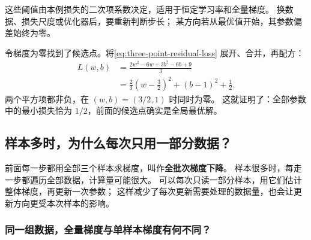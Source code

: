 \begin{boundarybox}
这些阈值由本例损失的二次项系数决定，适用于恒定学习率和全量梯度。
换数据、损失尺度或优化器后，要重新判断步长；
某方向若从最优值开始，其参数偏差始终为零。
\end{boundarybox}

\begin{example}[breakable=false,title={{\symboliconfont ★} 选读证明：为什么这是全局最小？}]
\label{proof:three-point-global-minimum}
令梯度为零找到了候选点。将\eqref{eq:three-point-residual-loss} 展开、合并，再配方：
\begin{equation}
\begin{aligned}
L(w,b)&=\frac{2w^2-6w+3b^2-6b+9}{3}\\
&=\frac23\left(w-\frac32\right)^2+(b-1)^2+\frac12.
\end{aligned}
\label{eq:three-point-loss-surface}
\end{equation}
两个平方项都非负，在 $(w,b)=(3/2,1)$ 时同时为零。
这就证明了：全部参数中的最小损失恰为 $1/2$，前面的候选点确实是全局最优解。
\end{example}

\subsection{样本多时，为什么每次只用一部分数据？}
\label{intro:mini-batch-training}

前面每一步都用全部三个样本求梯度，叫作\textbf{全批次梯度下降}。
样本很多时，每走一步都遍历全部数据，计算量可能很大。
可以每次只读一部分样本，用它们估计整体梯度，再更新一次参数；
这样减少了每次更新需要处理的数据量，也会让更新方向更受本次样本的影响。

\subsubsection{同一组数据，全量梯度与单样本梯度有何不同？}
\label{experiment:sample-gradient}

